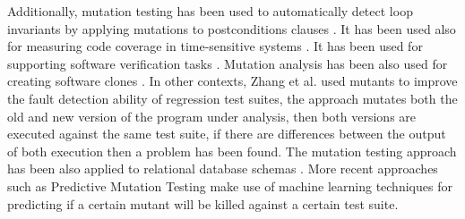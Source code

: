Additionally, mutation testing has been used to automatically detect loop invariants by applying mutations to postconditions clauses \cite{galeotti2015inferring}. It has been used also for measuring code coverage in time-sensitive systems \cite{pankumhang2015iterative}. It has been used for supporting software verification tasks \cite{groce2015verified}. Mutation analysis has been also used for creating software clones \cite{roy2009mutation}. In other contexts, Zhang et al. \cite{zhang2016isomorphic} used mutants to improve the fault detection ability of regression test suites, the approach mutates both the old and new version of the program under analysis, then both versions are executed against the same test suite, if there are differences between the output of both execution then a problem has been found.
The mutation testing approach has been also applied to relational database schemas \cite{wright2013efficient}. More recent approaches such as Predictive Mutation Testing \cite{zhang2018predictive} make use of machine learning techniques for predicting if a certain mutant will be killed against a certain test suite.



